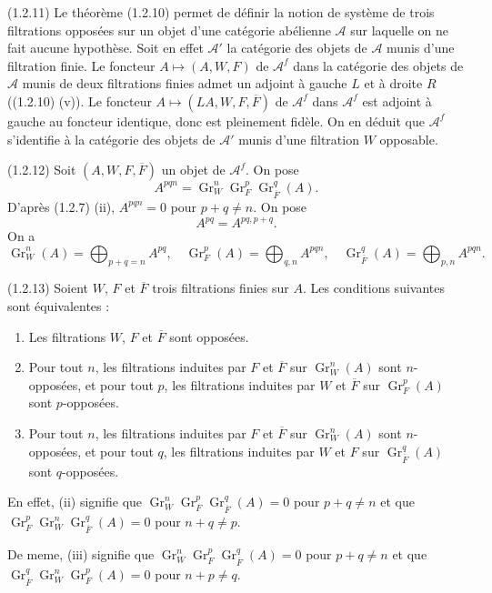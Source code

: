\documentclass[11pt,a4paper]{amsart}
\theoremstyle{plain}
\theoremstyle{definition}
\theoremstyle{remark}
\DeclareMathOperator{\Gr}{Gr}
\newcommand{\sA}{\mathscr{A}}
\numberwithin{equation}{subsection}
\begin{document}
(1.2.11) Le th\'eor\`eme (1.2.10) permet de d\'efinir la notion de syst\`eme de trois filtrations
oppos\'ees sur un objet d'une cat\'egorie ab\'elienne $\sA$ sur laquelle on ne fait aucune
hypoth\`ese. Soit en effet $\sA'$ la cat\'egorie des objets de $\sA$ munis d'une filtration finie.
Le foncteur $A \mapsto (A, W, F)$ de $\sA^f$ dans la cat\'egorie des objets de $\sA$ munis de
deux filtrations finies admet un adjoint \`a gauche $L$ et \`a droite $R$ ((1.2.10) (v)).
Le foncteur $A \mapsto (LA, W, F, \overline{F})$ de $\sA^f$ dans $\sA^f$ est adjoint \`a gauche au foncteur
identique, donc est pleinement fid\`ele. On en d\'eduit que $\sA^f$ s'identifie \`a la cat\'egorie
des objets de $\sA'$ munis d'une filtration $W$ opposable.

(1.2.12) Soit $(A, W, F, \overline{F})$ un objet de $\sA^f$. On pose
\[
A^{pqn} = \Gr_W^n \Gr_F^p \Gr_{\overline{F}}^q(A).
\]
D'apr\`es (1.2.7) (ii), $A^{pqn} = 0$ pour $p+q \neq n$. On pose
\[
A^{pq} = A^{pq,p+q}.
\]
On a
\[
\Gr_W^n(A) = \bigoplus_{p+q=n} A^{pq}, \quad
\Gr_F^p(A) = \bigoplus_{q,n} A^{pqn}, \quad
\Gr_{\overline{F}}^q(A) = \bigoplus_{p,n} A^{pqn}.
\]

(1.2.13) Soient $W$, $F$ et $\overline{F}$ trois filtrations finies sur $A$. Les conditions suivantes
sont \'equivalentes :
\begin{enumerate}
\item[(i)] Les filtrations $W$, $F$ et $\overline{F}$ sont oppos\'ees.
\item[(ii)] Pour tout $n$, les filtrations induites par $F$ et $\overline{F}$ sur $\Gr_W^n(A)$ sont $n$-oppos\'ees,
et pour tout $p$, les filtrations induites par $W$ et $\overline{F}$ sur $\Gr_F^p(A)$ sont $p$-oppos\'ees.
\item[(iii)] Pour tout $n$, les filtrations induites par $F$ et $\overline{F}$ sur $\Gr_W^n(A)$ sont $n$-oppos\'ees,
et pour tout $q$, les filtrations induites par $W$ et $F$ sur $\Gr_{\overline{F}}^q(A)$ sont $q$-oppos\'ees.
\end{enumerate}

En effet, (ii) signifie que $\Gr_W^n \Gr_F^p \Gr_{\overline{F}}^q(A) = 0$ pour $p+q \neq n$ et que
$\Gr_F^p \Gr_W^n \Gr_{\overline{F}}^q(A) = 0$ pour $n+q \neq p$.

De meme, (iii) signifie que $\Gr_W^n \Gr_F^p \Gr_{\overline{F}}^q(A) = 0$ pour $p+q \neq n$ et que
$\Gr_{\overline{F}}^q \Gr_W^n \Gr_F^p(A) = 0$ pour $n+p \neq q$.
\end{document}
